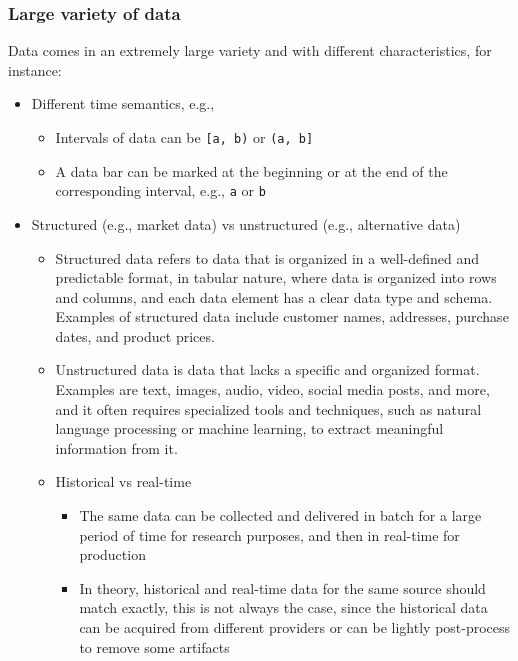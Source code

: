 \documentclass[11pt, reqno]{amsart}
\theoremstyle{definition}
\theoremstyle{remark}
\begin{document}
\subsubsection{Large variety of data}

Data comes in an extremely large variety and with different characteristics,
for instance:

\begin{itemize}
  \item Different time semantics, e.g.,
        \begin{itemize}
          \item Intervals of data can be \verb|[a, b)| or \verb|(a, b]|
          \item A data bar can be marked at the beginning or at the end of the
                corresponding interval, e.g., \verb|a| or \verb|b|
        \end{itemize}

  \item Structured (e.g., market data) vs unstructured (e.g., alternative
        data)
        \begin{itemize}
          \item Structured data refers to data that is organized in a
                well-defined and predictable format, in tabular nature, where
                data is organized into rows and columns, and each data
                element has a clear data type and schema. Examples
                of structured data include customer names, addresses, purchase
                dates, and product prices.
          \item Unstructured data is data that lacks a specific and organized
                format. Examples are text, images, audio, video, social media
                posts, and more, and it often requires specialized tools and
                techniques, such as natural language processing or machine
                learning, to extract meaningful information from it.

          \item Historical vs real-time
                \begin{itemize}
                  \item The same data can be collected and delivered in batch for a large
                        period of time for research purposes, and then in real-time for
                        production
                  \item In theory, historical and real-time data for the same source
                        should match exactly, this is not always the case, since the
                        historical data can be acquired from different providers or can be
                        lightly post-process to remove some artifacts
                \end{itemize}


\end{itemize}
\end{itemize}
\end{document}
